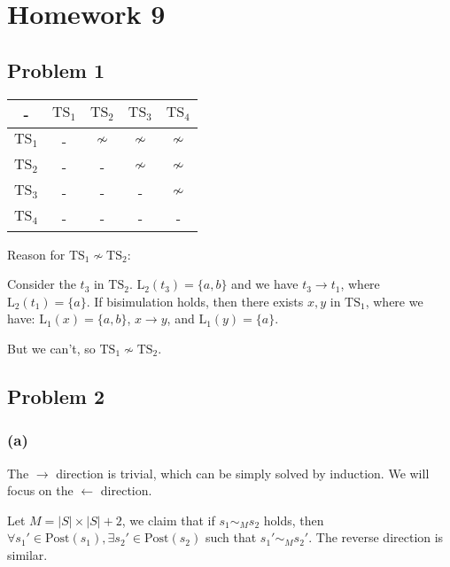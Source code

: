 \chapter{Homework 9}

\section{Problem 1}

\newcommand{\ns}{\not \sim}

\begin{tabular}{|c|c|c|c|c|} \hline
    -               & $\text{TS}_1$ & $\text{TS}_2$ & $\text{TS}_3$ & $\text{TS}_4$ \\ \hline
    $\text{TS}_1$   & -             & $\ns$         & $\ns$         & $\ns$         \\ \hline
    $\text{TS}_2$   & -             & -             & $\ns$         & $\ns$         \\ \hline
    $\text{TS}_3$   & -             & -             & -             & $\ns$         \\ \hline
    $\text{TS}_4$   & -             & -             & -             & -             \\ \hline
\end{tabular}

Reason for $\text{TS}_1 \ns \text{TS}_2$:

Consider the $t_3$ in $\text{TS}_2$. $\text{L}_2(t_3) = \{a, b\}$ and we have $t_3 \to t_1$, where $\text{L}_2(t_1) = \{a\}$.
If bisimulation holds, then there exists $x, y$ in $\text{TS}_1$, where we have:
$\text{L}_1(x) = \{a, b\}$, $x \to y$, and $\text{L}_1(y) = \{a\}$.

But we can't, so $\text{TS}_1 \ns \text{TS}_2$.

\section{Problem 2}

\subsection*{(a)}

The $\to$ direction is trivial, which can be simply solved by induction.
We will focus on the $\leftarrow$ direction.

Let $M = |S| \times |S| + 2$, we claim that if $s_1 \sim_{M} s_2$ holds, then
$\forall s_1' \in \text{Post}(s_1), \exists s_2' \in \text{Post}(s_2)$ such that $s_1' \sim_{M} s_2'$.
The reverse direction is similar.

